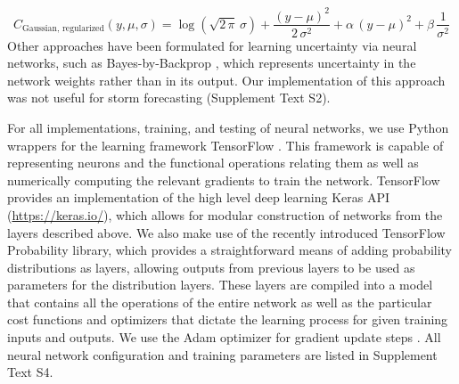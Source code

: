 \begin{equation}
    C_{\mathrm{Gaussian,\, regularized}}(y, \mu, \sigma) = \log\left(\sqrt{2\,\pi}\,\sigma \right) + \frac{\left(y-\mu \right)^2}{2\,\sigma^2} +  \alpha\,\left(y-\mu \right)^2 + \beta\,\frac{1}{\sigma^2} \label{eq:gaussian_mod}
\end{equation}
Other approaches have been formulated for learning uncertainty via neural networks, such as Bayes-by-Backprop \citep{Blundell2015}, which represents uncertainty in the network weights rather than in its output. Our implementation of this approach was not useful for storm forecasting (Supplement Text S2).

For all implementations, training, and testing of neural networks, we use Python wrappers for the learning framework TensorFlow \citep{tensorflow}. This framework is capable of representing neurons and the functional operations relating them as well as numerically computing the relevant gradients to train the network. TensorFlow provides an implementation of the high level deep learning Keras API (\url{https://keras.io/}), which allows for modular construction of networks from the layers described above. We also make use of the recently introduced TensorFlow Probability library, which provides a straightforward means of adding probability distributions as layers, allowing outputs from previous layers to be used as parameters for the distribution layers. These layers are compiled into a model that contains all the operations of the entire network as well as the particular cost functions and optimizers that dictate the learning process for given training inputs and outputs. We use the Adam optimizer for gradient update steps \citep{Kingma2014adam}. All neural network configuration and training parameters are listed in Supplement Text S4.


